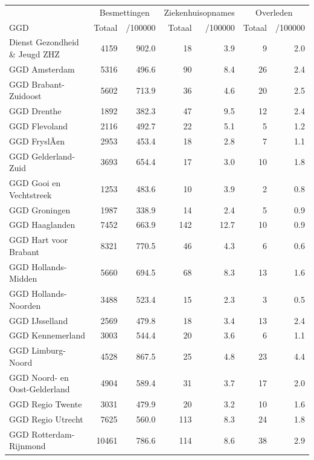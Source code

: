 \documentclass[
  english,
  man,floatsintext]{apa6}
\begin{document}
\begin{table}
\centering\begingroup\fontsize{10}{12}\selectfont

\begin{threeparttable}
\begin{tabular}{lrrrrrr}
\toprule
\multicolumn{1}{c}{ } & \multicolumn{2}{c}{Besmettingen} & \multicolumn{2}{c}{Ziekenhuisopnames} & \multicolumn{2}{c}{Overleden} \\
\cmidrule(l{3pt}r{3pt}){2-3} \cmidrule(l{3pt}r{3pt}){4-5} \cmidrule(l{3pt}r{3pt}){6-7}
GGD & Totaal & /100000 & Totaal & /100000 & Totaal & /100000\\
\midrule
Dienst Gezondheid \& Jeugd ZHZ & 4159 & 902.0 & 18 & 3.9 & 9 & 2.0\\
GGD Amsterdam & 5316 & 496.6 & 90 & 8.4 & 26 & 2.4\\
GGD Brabant-Zuidoost & 5602 & 713.9 & 36 & 4.6 & 20 & 2.5\\
GGD Drenthe & 1892 & 382.3 & 47 & 9.5 & 12 & 2.4\\
GGD Flevoland & 2116 & 492.7 & 22 & 5.1 & 5 & 1.2\\
GGD FryslÃ¢n & 2953 & 453.4 & 18 & 2.8 & 7 & 1.1\\
GGD Gelderland-Zuid & 3693 & 654.4 & 17 & 3.0 & 10 & 1.8\\
GGD Gooi en Vechtstreek & 1253 & 483.6 & 10 & 3.9 & 2 & 0.8\\
GGD Groningen & 1987 & 338.9 & 14 & 2.4 & 5 & 0.9\\
GGD Haaglanden & 7452 & 663.9 & 142 & 12.7 & 10 & 0.9\\
GGD Hart voor Brabant & 8321 & 770.5 & 46 & 4.3 & 6 & 0.6\\
GGD Hollands-Midden & 5660 & 694.5 & 68 & 8.3 & 13 & 1.6\\
GGD Hollands-Noorden & 3488 & 523.4 & 15 & 2.3 & 3 & 0.5\\
GGD IJsselland & 2569 & 479.8 & 18 & 3.4 & 13 & 2.4\\
GGD Kennemerland & 3003 & 544.4 & 20 & 3.6 & 6 & 1.1\\
GGD Limburg-Noord & 4528 & 867.5 & 25 & 4.8 & 23 & 4.4\\
GGD Noord- en Oost-Gelderland & 4904 & 589.4 & 31 & 3.7 & 17 & 2.0\\
GGD Regio Twente & 3031 & 479.9 & 20 & 3.2 & 10 & 1.6\\
GGD Regio Utrecht & 7625 & 560.0 & 113 & 8.3 & 24 & 1.8\\
GGD Rotterdam-Rijnmond & 10461 & 786.6 & 114 & 8.6 & 38 & 2.9\\

\end{tabular}
\end{threeparttable}
\end{table}
\end{document}
